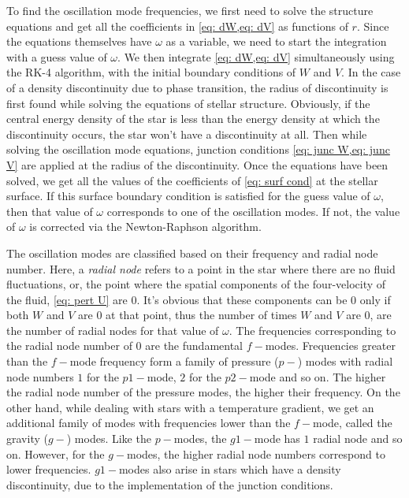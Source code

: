 \documentclass[a4paper,12pt,onehalfspacing]{report}
\begin{document}
To find the oscillation mode frequencies, we first need to solve the structure equations and get all the coefficients in \cref{eq: dW,eq: dV} as functions of $r$. Since the equations themselves have $\omega$ as a variable, we need to start the integration with a guess value of $\omega$. We then integrate \cref{eq: dW,eq: dV} simultaneously using the RK-4 algorithm, with the initial boundary conditions of $W$ and $V$. In the case of a density discontinuity due to phase transition, the radius of discontinuity is first found while solving the equations of stellar structure. Obviously, if the central energy density of the star is less than the energy density at which the discontinuity occurs, the star won't have a discontinuity at all. Then while solving the oscillation mode equations, junction conditions \cref{eq: junc W,eq: junc V} are applied at the radius of the discontinuity. Once the equations have been solved, we get all the values of the coefficients of \cref{eq: surf cond} at the stellar surface. If this surface boundary condition is satisfied for the guess value of $\omega$, then that value of $\omega$ corresponds to one of the oscillation modes. If not, the value of $\omega$ is corrected via the Newton-Raphson algorithm. 

The oscillation modes are classified based on their frequency and radial node number. Here, a \emph{radial node} refers to a point in the star where there are no fluid fluctuations, or, the point where the spatial components of the four-velocity of the fluid, \cref{eq: pert U} are $0$. It's obvious that these components can be $0$ only if both $W$ and $V$ are $0$ at that point, thus the number of times $W$ and $V$ are $0$, are the number of radial nodes for that value of $\omega$. The frequencies corresponding to the radial node number of $0$ are the fundamental $f-$modes. Frequencies greater than the $f-$mode frequency form a family of pressure ($p-$) modes with radial node numbers $1$ for the $p1-$mode, $2$ for the $p2-$mode and so on. The higher the radial node number of the pressure modes, the higher their frequency. On the other hand, while dealing with stars with a temperature gradient, we get an additional family of modes with frequencies lower than the $f-$mode, called the gravity ($g-$) modes. Like the $p-$modes, the $g1-$mode has $1$ radial node and so on. However, for the $g-$modes, the higher radial node numbers correspond to lower frequencies. $g1-$modes also arise in stars which have a density discontinuity, due to the implementation of the junction conditions. 
\end{document}
